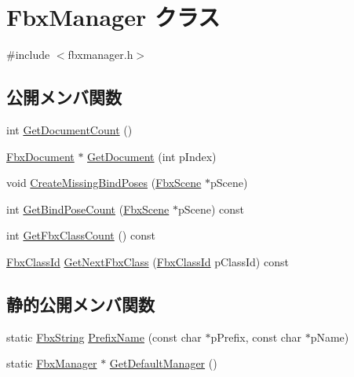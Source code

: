 \hypertarget{class_fbx_manager}{}\section{Fbx\+Manager クラス}
\label{class_fbx_manager}


{\ttfamily \#include $<$fbxmanager.\+h$>$}

\subsection*{公開メンバ関数}
\begin{DoxyCompactItemize}
\item 
int \hyperlink{class_fbx_manager_a989f88125a683f5c137e00cf126d53c6}{Get\+Document\+Count} ()
\item 
\hyperlink{class_fbx_document}{Fbx\+Document} $\ast$ \hyperlink{class_fbx_manager_ac9d6e93d2730ef5f4da5a5b99591b99d}{Get\+Document} (int p\+Index)
\item 
void \hyperlink{class_fbx_manager_a835e4e738e31eafa937b6fbd4b548804}{Create\+Missing\+Bind\+Poses} (\hyperlink{class_fbx_scene}{Fbx\+Scene} $\ast$p\+Scene)
\item 
int \hyperlink{class_fbx_manager_acf3fa4db57a5c7cb0134179aa1885309}{Get\+Bind\+Pose\+Count} (\hyperlink{class_fbx_scene}{Fbx\+Scene} $\ast$p\+Scene) const
\item 
int \hyperlink{class_fbx_manager_a402614ab76c557ac064ae8bbea28d119}{Get\+Fbx\+Class\+Count} () const
\item 
\hyperlink{class_fbx_class_id}{Fbx\+Class\+Id} \hyperlink{class_fbx_manager_a979014d6621deb83e5f310b9e5be5a41}{Get\+Next\+Fbx\+Class} (\hyperlink{class_fbx_class_id}{Fbx\+Class\+Id} p\+Class\+Id) const
\end{DoxyCompactItemize}
\subsection*{静的公開メンバ関数}
\begin{DoxyCompactItemize}
\item 
static \hyperlink{class_fbx_string}{Fbx\+String} \hyperlink{class_fbx_manager_ad4998934540803131a74f21041979826}{Prefix\+Name} (const char $\ast$p\+Prefix, const char $\ast$p\+Name)
\item 
static \hyperlink{class_fbx_manager}{Fbx\+Manager} $\ast$ \hyperlink{class_fbx_manager_acfe6f36b0029e3be94c210ad7bde7547}{Get\+Default\+Manager} ()
\end{DoxyCompactItemize}
